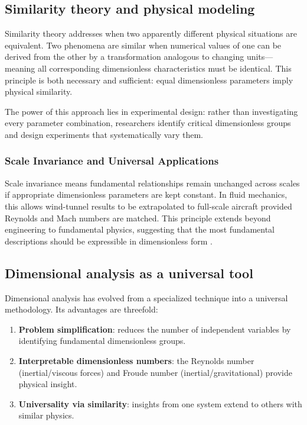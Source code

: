 \subsection{Similarity theory and physical modeling}

Similarity theory addresses when two apparently different physical situations are equivalent. Two phenomena are similar when numerical values of one can be derived from the other by a transformation analogous to changing units—meaning all corresponding dimensionless characteristics must be identical. This principle is both necessary and sufficient: equal dimensionless parameters imply physical similarity.

The power of this approach lies in experimental design: rather than investigating every parameter combination, researchers identify critical dimensionless groups and design experiments that systematically vary them.

\subsubsection*{Scale Invariance and Universal Applications}

Scale invariance means fundamental relationships remain unchanged across scales if appropriate dimensionless parameters are kept constant. In fluid mechanics, this allows wind-tunnel results to be extrapolated to full-scale aircraft provided Reynolds and Mach numbers are matched. This principle extends beyond engineering to fundamental physics, suggesting that the most fundamental descriptions should be expressible in dimensionless form \cite{zierep1991}.

\subsection{Dimensional analysis as a universal tool}

Dimensional analysis has evolved from a specialized technique into a universal methodology. Its advantages are threefold:
\begin{enumerate}
\item \textbf{Problem simplification}: reduces the number of independent variables by identifying fundamental dimensionless groups.
\item \textbf{Interpretable dimensionless numbers}: the Reynolds number (inertial/viscous forces) and Froude number (inertial/gravitational) provide physical insight.
\item \textbf{Universality via similarity}: insights from one system extend to others with similar physics.
\end{enumerate}

